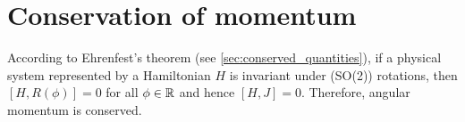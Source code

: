     \section{Conservation of momentum}

    According to Ehrenfest's theorem (see \cref{sec:conserved_quantities}), if a physical system represented by a Hamiltonian $H$ is invariant under (SO(2)) rotations, then $[H,R(\phi)] = 0$ for all $\phi\in\mathbb{R}$ and hence $[H,J]=0$. Therefore, angular momentum is conserved.

